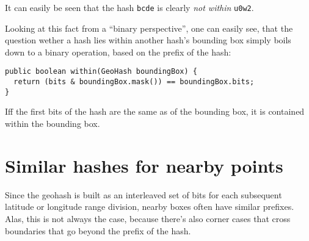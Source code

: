 \documentclass[a4paper,11pt,twoside]{scrartcl}
\begin{document}
It can easily be seen that the hash \texttt{bcde} is clearly \emph{not within} \texttt{u0w2}.

Looking at this fact from a “binary perspective”, one can easily see, that the question wether a hash lies within another hash's bounding box simply boils down to a binary operation, based on the prefix of the hash:

\begin{lstlisting}
public boolean within(GeoHash boundingBox) {
  return (bits & boundingBox.mask()) == boundingBox.bits;
}
\end{lstlisting}

Iff the first bits of the hash are the same as of the bounding box, it is contained within the bounding box.



\section{Similar hashes for nearby points} %
\label{sec:similar_hashes_for_nearby_pojnts}
Since the geohash is built as an interleaved set of bits for each subsequent latitude or longitude range division, nearby boxes often have similar prefixes. Alas, this is not always the case, because there's also corner cases that cross boundaries that go beyond the prefix of the hash.
\end{document}
